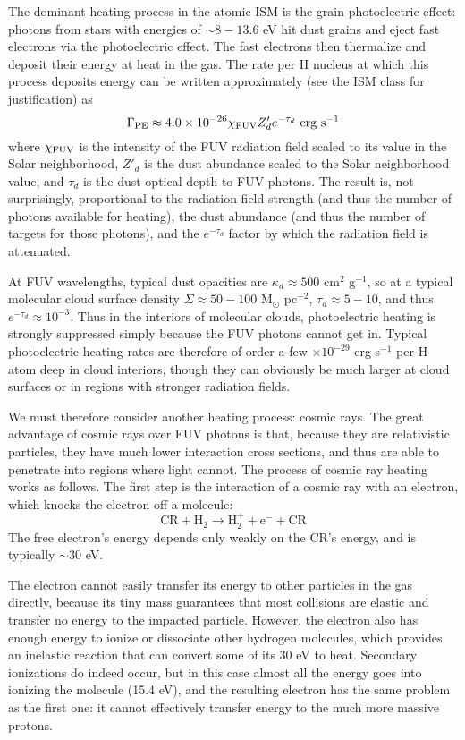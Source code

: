 The dominant heating process in the atomic ISM is the grain photoelectric effect: photons from stars with energies of $\sim 8-13.6$ eV hit dust grains and eject fast electrons via the photoelectric effect. The fast electrons then thermalize and deposit their energy at heat in the gas. The rate per H nucleus at which this process deposits energy can be written approximately (see the ISM class for justification) as
\begin{equation}
\Gamma_{\rm PE} \approx 4.0\times 10^{-26} \chi_{\rm FUV} Z_d' e^{-\tau_d}\mbox{ erg s}^{-1}
\end{equation}
where $\chi_{\rm FUV}$ is the intensity of the FUV radiation field scaled to its value in the Solar neighborhood, $Z'_d$ is the dust abundance scaled to the Solar neighborhood value, and $\tau_d$ is the dust optical depth to FUV photons. The result is, not surprisingly, proportional to the radiation field strength (and thus the number of photons available for heating), the dust abundance (and thus the number of targets for those photons), and the $e^{-\tau_d}$ factor by which the radiation field is attenuated.

At FUV wavelengths, typical dust opacities are $\kappa_d \approx 500$ cm$^2$ g$^{-1}$, so at a typical molecular cloud surface density $\Sigma\approx 50 - 100$ M$_\odot$ pc$^{-2}$, $\tau_d \approx 5-10$, and thus $e^{-\tau_d} \approx 10^{-3}$. Thus in the interiors of molecular clouds, photoelectric heating is strongly suppressed simply because the FUV photons cannot get in. Typical photoelectric heating rates are therefore of order a few $\times 10^{-29}$ erg s$^{-1}$ per H atom deep in cloud interiors, though they can obviously be much larger at cloud surfaces or in regions with stronger radiation fields.

We must therefore consider another heating process: cosmic rays. The great advantage of cosmic rays over FUV photons is that, because they are relativistic particles, they have much lower interaction cross sections, and thus are able to penetrate into regions where light cannot. The process of cosmic ray heating works as follows. The first step is the interaction of a cosmic ray with an electron, which knocks the electron off a molecule:
\begin{equation}
\mbox{CR}+\mbox{H}_2 \rightarrow \mbox{H}_2^+ + \mbox{e}^- + \mbox{CR}
\end{equation}
The free electron's energy depends only weakly on the CR's energy, and is typically $\sim 30$ eV.

The electron cannot easily transfer its energy to other particles in the gas directly, because its tiny mass guarantees that most collisions are elastic and transfer no energy to the impacted particle. However, the electron also has enough energy to ionize or dissociate other hydrogen molecules, which provides an inelastic reaction that can convert some of its 30 eV to heat. Secondary ionizations do indeed occur, but in this case almost all the energy goes into ionizing the molecule (15.4 eV), and the resulting electron has the same problem as the first one: it cannot effectively transfer energy to the much more massive protons.

